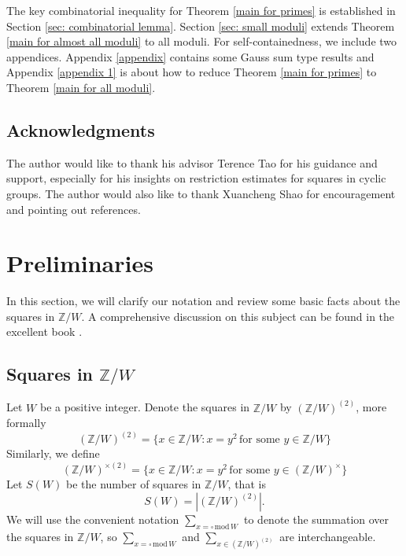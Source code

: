 \documentclass[11pt]{amsart}
\theoremstyle{plain} %
\theoremstyle{remark}
\numberwithin{equation}{section}
\newcommand{\Z}{\mathbb{Z}}
\newcommand{\sqw}[1]{\sum_{#1=\square\,\mathrm{mod}\,W}}
\begin{document}
The key combinatorial inequality for Theorem \ref{main for primes} is established in Section \ref{sec: combinatorial lemma}. Section \ref{sec: small moduli} extends Theorem \ref{main for almost all moduli} to all moduli. For self-containedness, we include two appendices. Appendix \ref{appendix} contains some Gauss sum type results and Appendix \ref{appendix 1} is about how to reduce Theorem \ref{main for primes} to Theorem \ref{main for all moduli}.

\subsection{Acknowledgments}

The author would like to thank his advisor Terence Tao for his guidance and support, especially for his insights on restriction estimates for squares in cyclic groups. The author would also like to thank Xuancheng Shao for encouragement and pointing out references.

\section{Preliminaries}\label{sec: preliminaries}

In this section, we will clarify our notation and review some basic facts about the squares in $\Z/W$. A comprehensive discussion on this subject can be found in the excellent book \cite[Chapter 3]{ANT}.

\subsection{Squares in $\Z/W$}
Let $W$ be a positive integer. Denote the squares in $\Z/W$ by $(\Z/W)^{(2)}$, more formally
\begin{equation*}
    (\Z/W)^{(2)}=\{x\in\Z/W:x=y^2\,\text{for some $y\in\Z/W$}\}
\end{equation*}
Similarly, we define
\begin{equation*}
    (\Z/W)^{\times(2)}=\{x\in\Z/W:x=y^2\,\text{for some $y\in(\Z/W)^{\times}$}\}
\end{equation*}
Let $S(W)$ be the number of squares in $\Z/W$, that is
\begin{equation*}
    S(W)=|(\Z/W)^{(2)}|.
\end{equation*}
We will use the convenient notation $\sqw{x}$ to denote the summation over the squares in $\Z/W$, so $\sqw{x}$ and $\sum_{x\in(\Z/W)^{(2)}}$ are interchangeable.
\end{document}
